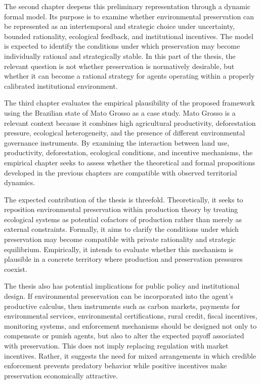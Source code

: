 The second chapter deepens this preliminary representation through a dynamic formal model. Its purpose is to examine whether environmental preservation can be represented as an intertemporal and strategic choice under uncertainty, bounded rationality, ecological feedback, and institutional incentives. The model is expected to identify the conditions under which preservation may become individually rational and strategically stable. In this part of the thesis, the relevant question is not whether preservation is normatively desirable, but whether it can become a rational strategy for agents operating within a properly calibrated institutional environment.

The third chapter evaluates the empirical plausibility of the proposed framework using the Brazilian state of Mato Grosso as a case study. Mato Grosso is a relevant context because it combines high agricultural productivity, deforestation pressure, ecological heterogeneity, and the presence of different environmental governance instruments. By examining the interaction between land use, productivity, deforestation, ecological conditions, and incentive mechanisms, the empirical chapter seeks to assess whether the theoretical and formal propositions developed in the previous chapters are compatible with observed territorial dynamics.

The expected contribution of the thesis is threefold. Theoretically, it seeks to reposition environmental preservation within production theory by treating ecological systems as potential cofactors of production rather than merely as external constraints. Formally, it aims to clarify the conditions under which preservation may become compatible with private rationality and strategic equilibrium. Empirically, it intends to evaluate whether this mechanism is plausible in a concrete territory where production and preservation pressures coexist.

The thesis also has potential implications for public policy and institutional design. If environmental preservation can be incorporated into the agent's productive calculus, then instruments such as carbon markets, payments for environmental services, environmental certifications, rural credit, fiscal incentives, monitoring systems, and enforcement mechanisms should be designed not only to compensate or punish agents, but also to alter the expected payoff associated with preservation. This does not imply replacing regulation with market incentives. Rather, it suggests the need for mixed arrangements in which credible enforcement prevents predatory behavior while positive incentives make preservation economically attractive.

